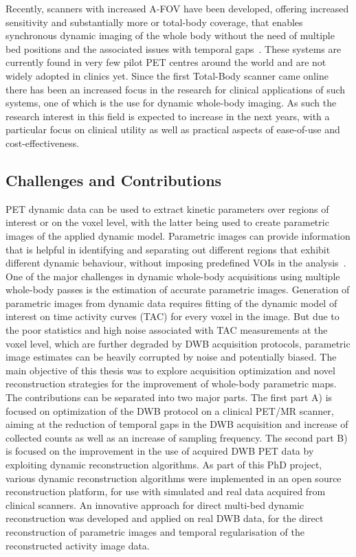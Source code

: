 Recently, scanners with increased A-FOV have been developed, offering increased sensitivity and substantially more or total-body coverage, that enables synchronous dynamic imaging of the whole body without the need of multiple bed positions and the associated issues with temporal gaps~\cite{Karp2020,Siegel2020, Cherry2018}.
These systems are currently found in very few pilot PET centres around the world and are not widely adopted in clinics yet. Since the first Total-Body scanner came online there has been an increased focus in the research for clinical applications of such systems, one of which is the use for dynamic whole-body imaging. As such the research interest in this field is expected to increase in the next years, with a particular focus on clinical utility as well as practical aspects of ease-of-use and cost-effectiveness.

\subsection*{Challenges and Contributions}
PET dynamic data can be used to extract kinetic parameters over regions of interest or on the voxel level, with the latter being used to create parametric images of the applied dynamic model.
Parametric images can provide information that is helpful in identifying and separating out different regions that exhibit different dynamic behaviour, without imposing predefined VOIs in the analysis~\cite{Gallezot2019}.  
One of the major challenges in dynamic whole-body acquisitions using multiple whole-body passes is the estimation of accurate parametric images. Generation of parametric images from dynamic data requires fitting of the dynamic model of interest on time activity curves (TAC) for every voxel in the image. But due to the poor statistics and high noise associated with TAC measurements at the voxel level, which are further degraded by DWB acquisition protocols, parametric image estimates can be heavily corrupted by noise and potentially biased. 
The main objective of this thesis was to explore acquisition optimization and novel reconstruction strategies for the improvement of whole-body parametric maps. 
The contributions can be separated into two major parts. The first part A) is focused on optimization of the DWB protocol on a clinical PET/MR scanner, aiming at the reduction of temporal gaps in the DWB acquisition and increase of collected counts as well as an increase of sampling frequency. The second part B) is focused on the improvement in the use of acquired DWB PET data by exploiting dynamic reconstruction algorithms. As part of this PhD project, various dynamic reconstruction algorithms were implemented in an open source reconstruction platform, for use with simulated and real data acquired from clinical scanners. An innovative approach for direct multi-bed dynamic reconstruction was developed and applied on real DWB data, for the direct reconstruction of parametric images and temporal regularisation of the reconstructed activity image data.

